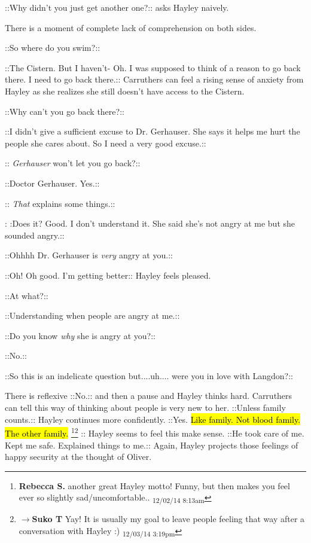  {\color[RGB]{255,153,0}::Why didn't you just get another one?:: } asks Hayley naively.

There is a moment of complete lack of comprehension on both sides.

 {\color[RGB]{153,0,255}::So where do you swim?::} 

 {\color[RGB]{255,153,0}::The Cistern.  But I haven't- Oh.  I was supposed to think of a reason to go back there.  I need to go back there.::}  Carruthers can feel a rising sense of anxiety from Hayley as she realizes she still doesn't have access to the Cistern.

 {\color[RGB]{153,0,255}::Why can't you go back there?::} 

 {\color[RGB]{255,153,0}::I didn't give a sufficient excuse to Dr. Gerhauser.  She says it helps me hurt the people she cares about.  So I need a very good excuse.::} 

 {\color[RGB]{153,0,255}::} \textit{ {\color[RGB]{153,0,255}Gerhauser} } {\color[RGB]{153,0,255} won't let you go back?::} 

 {\color[RGB]{255,153,0}::Doctor Gerhauser. Yes.::} 

 {\color[RGB]{153,0,255}::} \textit{ {\color[RGB]{153,0,255}That} } {\color[RGB]{153,0,255} explains some things.::} 

: {\color[RGB]{255,153,0}:Does it?  Good.  I don't understand it.  She said she's not angry at me but she sounded angry.::} 

 {\color[RGB]{153,0,255}::Ohhhh Dr. Gerhauser is } \textit{ {\color[RGB]{153,0,255}very } } {\color[RGB]{153,0,255}angry at you.::} 

 {\color[RGB]{255,153,0}::Oh!  Oh good.  I'm getting better:: }  Hayley feels pleased.

 {\color[RGB]{153,0,255}::At what?::} 

 {\color[RGB]{255,153,0}::Understanding when people are angry at me.::} 

 {\color[RGB]{153,0,255}::Do you know } \textit{ {\color[RGB]{153,0,255}why} } {\color[RGB]{153,0,255} she is angry at you?::} 

 {\color[RGB]{255,153,0}::No.::} 

 {\color[RGB]{153,0,255}::So this is an indelicate question but....uh.... were you in love with Langdon?::} 

There is reflexive  {\color[RGB]{255,153,0}::No.::}  and then a pause and Hayley thinks hard.  Carruthers can tell this way of thinking about people is very new to her.  {\color[RGB]{255,153,0} ::Unless family counts.::}   Hayley continues more confidently.   {\color[RGB]{255,153,0}::Yes. }  {\color[RGB]{255,153,0}\hl{Like family.  Not blood family. The other family.}} \footnote{\textbf{Rebecca S. }another great Hayley motto! Funny, but then makes you feel ever so slightly sad/uncomfortable.. \textsubscript{12/02/14 8:13am}}\footnote{$\rightarrow$\textbf{Suko T }Yay!  It is usually my goal to leave people feeling that way after a conversation with Hayley :) \textsubscript{12/03/14 3:19pm}} {\color[RGB]{255,153,0}:: }   Hayley seems to feel this make sense.  {\color[RGB]{255,153,0} ::He took care of me.  Kept me safe.  Explained things to me.:: }  Again, Hayley projects those feelings of happy security at the thought of Oliver.

